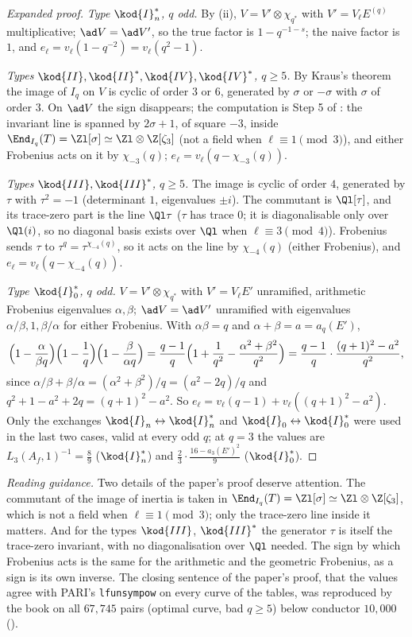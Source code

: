 \begin{sloppypar}
\begin{proof}[Expanded proof]
\emph{Type $\kod{I}_n^*$, $q$ odd.} By (ii), $V=V'\otimes\chi_{q^*}$ with $V'=V_\ell E^{(q)}$ multiplicative; $\ad V=\ad V'$, so the true factor is $1-q^{-1-s}$; the
naive factor is $1$, and $e_\ell=v_\ell(1-q^{-2})=v_\ell(q^2-1)$.

\emph{Types $\kod{II},\kod{II}^*,\kod{IV},\kod{IV}^*$, $q\ge5$.} By Kraus's theorem the image of $I_q$ on $V$ is cyclic of order $3$ or $6$, generated by $\sigma$ or $-\sigma$ with $\sigma$ of order $3$.
On $\ad V$ the sign disappears; the computation is Step 5 of : the invariant line is spanned by $2\sigma+1$, of square $-3$, inside $\End_{I_q}(T)=\Zl[\sigma]\simeq\Zl\otimes\Z[\zeta_3]$
(not a field when $\ell\equiv1\pmod3$), and either Frobenius acts on it by $\chi_{-3}(q)$; $e_\ell=v_\ell(q-\chi_{-3}(q))$.

\emph{Types $\kod{III},\kod{III}^*$, $q\ge5$.} The image is cyclic of order $4$, generated by $\tau$ with $\tau^2=-1$ (determinant $1$, eigenvalues $\pm i$). The commutant is $\Ql[\tau]$, and its
trace-zero part is the line $\Ql\tau$ ($\tau$ has trace $0$; it is diagonalisable only over $\Ql(i)$, so no diagonal basis exists over $\Ql$ when $\ell\equiv3\pmod4$). Frobenius sends $\tau$
to $\tau^q=\tau^{\chi_{-4}(q)}$, so it acts on the line by $\chi_{-4}(q)$ (either Frobenius), and $e_\ell=v_\ell(q-\chi_{-4}(q))$.

\emph{Type $\kod{I}_0^*$, $q$ odd.} $V=V'\otimes\chi_{q^*}$ with $V'=V_\ell E'$ unramified, arithmetic Frobenius eigenvalues $\alpha,\beta$; $\ad V=\ad V'$ unramified with eigenvalues
$\alpha/\beta,1,\beta/\alpha$ for either Frobenius. With $\alpha\beta=q$ and $\alpha+\beta=a=a_q(E')$,
\[
\Bigl(1-\frac{\alpha}{\beta q}\Bigr)\Bigl(1-\frac1q\Bigr)\Bigl(1-\frac{\beta}{\alpha q}\Bigr)=\frac{q-1}{q}\Bigl(1+\frac1{q^2}-\frac{\alpha^2+\beta^2}{q^2}\Bigr)=\frac{q-1}{q}\cdot\frac{(q+1)^2-a^2}{q^2},
\]
since $\alpha/\beta+\beta/\alpha=(\alpha^2+\beta^2)/q=(a^2-2q)/q$ and $q^2+1-a^2+2q=(q+1)^2-a^2$. So $e_\ell=v_\ell(q-1)+v_\ell((q+1)^2-a^2)$. Only the exchanges $\kod{I}_n\leftrightarrow\kod{I}_n^*$ and
$\kod{I}_0\leftrightarrow\kod{I}_0^*$ were used in the last two cases, valid at every odd $q$; at $q=3$ the values are $L_3(A_f,1)^{-1}=\frac89$ ($\kod{I}_n^*$) and $\frac23\cdot\frac{16-a_3(E')^2}9$ ($\kod{I}_0^*$).
\end{proof}

\noindent\emph{Reading guidance.} Two details of the paper's proof deserve attention. The commutant of the image of inertia is taken in $\End_{I_q}(T)=\Zl[\sigma]\simeq\Zl\otimes\Z[\zeta_3]$,
which is not a field when $\ell\equiv1\pmod3$; only the trace-zero line inside it matters. And for the types $\kod{III}$, $\kod{III}^*$ the generator $\tau$ is itself the trace-zero
invariant, with no diagonalisation over $\Ql$ needed. The sign by which Frobenius acts is the same for the arithmetic and the geometric Frobenius, as a sign is its
own inverse. The closing sentence of the paper's proof, that the values agree with PARI's \texttt{lfunsympow} on every curve of the tables, was
reproduced by the book on all $67{,}745$ pairs (optimal curve, bad $q\ge5$) below conductor $10{,}000$ ().


\end{sloppypar}
